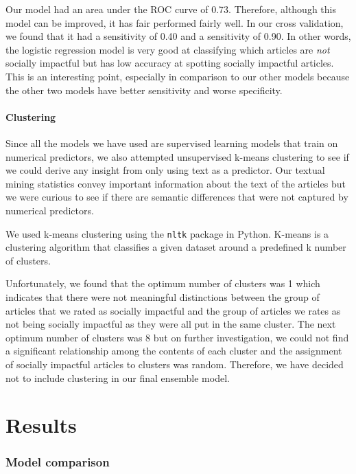 \documentclass[10pt,letterpaper]{article}
\begin{document}
Our model had an area under the ROC curve of 0.73. Therefore, although
this model can be improved, it has fair performed fairly well. In our
cross validation, we found that it had a sensitivity of 0.40 and a
sensitivity of 0.90. In other words, the logistic regression model is
very good at classifying which articles are \emph{not} socially
impactful but has low accuracy at spotting socially impactful articles.
This is an interesting point, especially in comparison to our other
models because the other two models have better sensitivity and worse
specificity.

\paragraph{Clustering}\label{clustering}

Since all the models we have used are supervised learning models that
train on numerical predictors, we also attempted unsupervised k-means
clustering to see if we could derive any insight from only using text as
a predictor. Our textual mining statistics convey important information
about the text of the articles but we were curious to see if there are
semantic differences that were not captured by numerical predictors.

We used k-means clustering using the \texttt{nltk} package in Python.
K-means is a clustering algorithm that classifies a given dataset around
a predefined k number of clusters.

Unfortunately, we found that the optimum number of clusters was 1 which
indicates that there were not meaningful distinctions between the group
of articles that we rated as socially impactful and the group of
articles we rates as not being socially impactful as they were all put
in the same cluster. The next optimum number of clusters was 8 but on
further investigation, we could not find a significant relationship
among the contents of each cluster and the assignment of socially
impactful articles to clusters was random. Therefore, we have decided
not to include clustering in our final ensemble model.

\section{Results}\label{results}

\subsubsection{Model comparison}\label{model-comparison}
\end{document}
